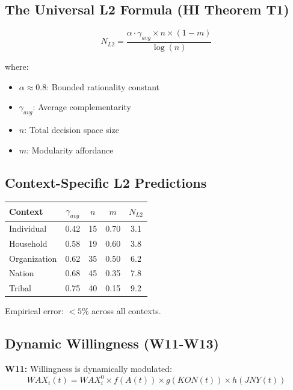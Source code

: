 \subsection{The Universal L2 Formula (HI Theorem T1)}

\begin{equation}
\boxed{
N_{L2} = \frac{\alpha \cdot \gamma_{avg} \times n \times (1-m)}{\log(n)}
}
\label{eq:mp-n-l2}
\end{equation}

where:
\begin{itemize}[nosep]
\item $\alpha \approx 0.8$: Bounded rationality constant
\item $\gamma_{avg}$: Average complementarity
\item $n$: Total decision space size
\item $m$: Modularity affordance
\end{itemize}

\subsection{Context-Specific L2 Predictions}

\begin{center}
\renewcommand{\arraystretch}{1.2}
\begin{tabular}{@{}lcccc@{}}
\toprule
\textbf{Context} & $\gamma_{avg}$ & $n$ & $m$ & $N_{L2}$ \\
\midrule
Individual & 0.42 & 15 & 0.70 & 3.1 \\
Household & 0.58 & 19 & 0.60 & 3.8 \\
Organization & 0.62 & 35 & 0.50 & 6.2 \\
Nation & 0.68 & 45 & 0.35 & 7.8 \\
Tribal & 0.75 & 40 & 0.15 & 9.2 \\
\bottomrule
\end{tabular}
\end{center}

Empirical error: $< 5\%$ across all contexts.

\subsection{Dynamic Willingness (W11-W13)}

\textbf{W11:} Willingness is dynamically modulated:
\begin{equation}
WAX_i(t) = WAX_i^0 \times f(A(t)) \times g(KON(t)) \times h(JNY(t))
\label{eq:mp-wax-dynamic}
\end{equation}

